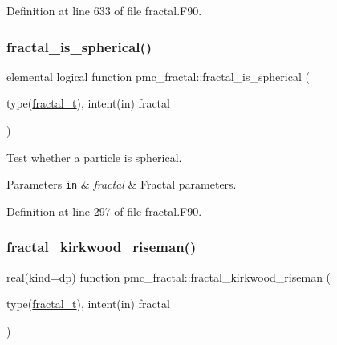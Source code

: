 Definition at line 633 of file fractal.\+F90.

\mbox{\label{namespacepmc__fractal_a4b772cc8c37c9773a9ff601e87dacd69}} 
\subsubsection{\texorpdfstring{fractal\+\_\+is\+\_\+spherical()}{fractal\_is\_spherical()}}
{\footnotesize\ttfamily elemental logical function pmc\+\_\+fractal\+::fractal\+\_\+is\+\_\+spherical (\begin{DoxyParamCaption}\item[{type(\mbox{\hyperlink{structpmc__fractal_1_1fractal__t}{fractal\+\_\+t}}), intent(in)}]{fractal }\end{DoxyParamCaption})}



Test whether a particle is spherical. 


\begin{DoxyParams}[1]{Parameters}
\mbox{\tt in}  & {\em fractal} & Fractal parameters. \\
\hline
\end{DoxyParams}


Definition at line 297 of file fractal.\+F90.

\mbox{\label{namespacepmc__fractal_a0124f3a93e7460e0f6889c214040ed54}} 
\subsubsection{\texorpdfstring{fractal\+\_\+kirkwood\+\_\+riseman()}{fractal\_kirkwood\_riseman()}}
{\footnotesize\ttfamily real(kind=dp) function pmc\+\_\+fractal\+::fractal\+\_\+kirkwood\+\_\+riseman (\begin{DoxyParamCaption}\item[{type(\mbox{\hyperlink{structpmc__fractal_1_1fractal__t}{fractal\+\_\+t}}), intent(in)}]{fractal }\end{DoxyParamCaption})}



